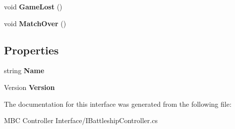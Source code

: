 \begin{DoxyCompactItemize}
\item 
\hypertarget{interface_m_b_c_core_1_1_i_battleship_controller_a11a124b6c16dfcd68ef7e1e1570ca1a7}{void {\bfseries Game\-Lost} ()}\label{interface_m_b_c_core_1_1_i_battleship_controller_a11a124b6c16dfcd68ef7e1e1570ca1a7}

\item 
\hypertarget{interface_m_b_c_core_1_1_i_battleship_controller_acb4309d783e0ebb56ad46abad1c16bbb}{void {\bfseries Match\-Over} ()}\label{interface_m_b_c_core_1_1_i_battleship_controller_acb4309d783e0ebb56ad46abad1c16bbb}

\end{DoxyCompactItemize}
\subsection*{Properties}
\begin{DoxyCompactItemize}
\item 
\hypertarget{interface_m_b_c_core_1_1_i_battleship_controller_a2306989cc6626b2aa807a4c7a69ab859}{string {\bfseries Name}}\label{interface_m_b_c_core_1_1_i_battleship_controller_a2306989cc6626b2aa807a4c7a69ab859}

\item 
\hypertarget{interface_m_b_c_core_1_1_i_battleship_controller_a50be6fcfd4fb27b0f49f16cada6a09bb}{Version {\bfseries Version}}\label{interface_m_b_c_core_1_1_i_battleship_controller_a50be6fcfd4fb27b0f49f16cada6a09bb}

\end{DoxyCompactItemize}


The documentation for this interface was generated from the following file\-:\begin{DoxyCompactItemize}
\item 
M\-B\-C Controller Interface/I\-Battleship\-Controller.\-cs\end{DoxyCompactItemize}
